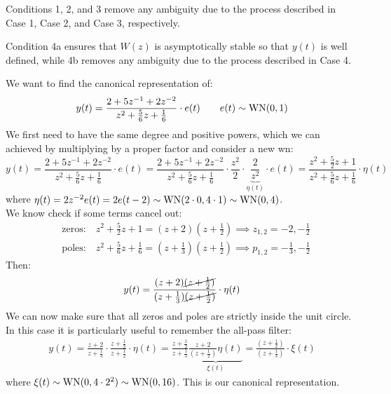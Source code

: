 \begin{rem}
Conditions 1, 2, and 3 remove any ambiguity due to the process described in Case 1, Case 2, and Case 3, respectively. 

Condition 4a ensures that $W(z)$ is asymptotically stable so that $y(t)$ is well defined, while 4b removes any ambiguity due to the process described in Case 4.
\end{rem}
\begin{exa}
We want to find the canonical representation of:
\begin{align*}
	y(t)=\frac{2+5z^{-1}+2z^{-2}}{z^2+\frac{5}{6}z+\frac{1}{6}}\cdot e(t)  \qquad e(t)\sim \operatorname{WN}(0,1)
\end{align*}
We first need to have the same degree and positive powers, which we can achieved by multiplying by a proper factor and consider a new \gls{wn}:
\begin{equation*}
	y(t)=
	\frac{2+5z^{-1}+2z^{-2}}{z^2+\frac{5}{6}z+\frac{1}{6}}\cdot e(t)
	=\frac{2+5z^{-1}+2z^{-2}}{z^2+\frac{5}{6}z+\frac{1}{6}}\cdot\frac{z^2}{2}\cdot\underbrace{\frac{2}{z^2}}_{\eta(t)}\cdot e(t)
	=\frac{z^2+\frac{5}{2}z+1}{z^2+\frac{5}{6}z+\frac{1}{6}}\cdot \eta(t)
\end{equation*}
where $\eta(t)=2z^{-2}e(t)=2e(t-2)\sim \operatorname{WN}(2\cdot0,4\cdot 1)\sim \operatorname{WN}(0,4)$.\\
We know check if some terms cancel out:
\begin{align*}
	&\text{zeros:}\quad z^2+\frac{5}{2}z+1=(z+2)\left( z+\frac{1}{2} \right)   \implies z_{1,2}=-2,-\frac{1}{2}\\
	&\text{poles:}\quad z^2+\frac{5}{6}z+\frac{1}{6}=\left( z+\frac{1}{3} \right)  \left( z+\frac{1}{2} \right) \implies p_{1,2}=-\frac{1}{3},-\frac{1}{2}
\end{align*}
Then:
\begin{align*}
	y(t)=\frac{(z+2)\cancel{(z+\frac{1}{2})}}{(z+\frac{1}{3})\cancel{(z+\frac{1}{2})}}\cdot \eta(t) 
\end{align*}
We can now make sure that all zeros and poles are strictly inside the unit circle. In this case it is particularly useful to remember the all-pass filter:
\begin{align*}
	y(t)=\frac{z+2}{z+\frac{1}{3}}\cdot\frac{z+\frac{1}{2} }{z+\frac{1}{2}}\cdot\eta(t)=\frac{z+\frac{1}{2}}{z+\frac{1}{3}}\underbrace{\frac{z+2}{(z+\frac{1}{2})}\eta(t)}_{\xi(t)}=\frac{(z+\frac{1}{2})}{(z+\frac{1}{3})}\cdot \xi(t)
\end{align*}
where $\xi(t)\sim \operatorname{WN}(0,4\cdot2^2)\sim \operatorname{WN}(0,16)$. This is our canonical representation.
\end{exa}
